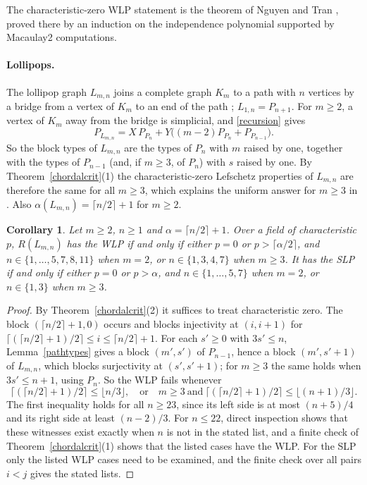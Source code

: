 \documentclass[11pt,a4paper]{article}
\newtheorem{corollary}[theorem]{Corollary}
\theoremstyle{definition}
\begin{document}
The characteristic-zero WLP statement is the theorem of Nguyen and Tran \cite[Theorem~1.2(1)]{NT}, proved there by an induction on the independence polynomial supported by Macaulay2 computations.

\paragraph{Lollipops.}
The lollipop graph $L_{m,n}$ joins a complete graph $K_m$ to a path with $n$ vertices by a bridge from a vertex of $K_m$ to an end of the path \cite{TPS}; $L_{1,n}=P_{n+1}$. For $m\ge2$, a vertex of $K_m$ away from the bridge is simplicial, and \eqref{recursion} gives
\[
 P_{L_{m,n}}=X\,P_{P_n}+Y\big((m-2)P_{P_n}+P_{P_{n-1}}\big).
\]
So the block types of $L_{m,n}$ are the types of $P_n$ with $m$ raised by one, together with the types of $P_{n-1}$ (and, if $m\ge3$, of $P_n$) with $s$ raised by one. By Theorem~\ref{chordalcrit}(1) the characteristic-zero Lefschetz properties of $L_{m,n}$ are therefore the same for all $m\ge3$, which explains the uniform answer for $m\ge3$ in \cite{TPS}. Also $\alpha(L_{m,n})=\lceil n/2\rceil+1$ for $m\ge2$.

\begin{corollary}\label{lollipops}
Let $m\ge2$, $n\ge1$ and $\alpha=\lceil n/2\rceil+1$. Over a field of characteristic $p$, $R(L_{m,n})$ has the WLP if and only if either $p=0$ or $p>\lceil\alpha/2\rceil$, and $n\in\{1,\dots,5,7,8,11\}$ when $m=2$, or $n\in\{1,3,4,7\}$ when $m\ge3$. It has the SLP if and only if either $p=0$ or $p>\alpha$, and $n\in\{1,\dots,5,7\}$ when $m=2$, or $n\in\{1,3\}$ when $m\ge3$.
\end{corollary}
\begin{proof}
By Theorem~\ref{chordalcrit}(2) it suffices to treat characteristic zero. The block $(\lceil n/2\rceil+1,0)$ occurs and blocks injectivity at $(i,i+1)$ for $\lceil(\lceil n/2\rceil+1)/2\rceil\le i\le\lceil n/2\rceil+1$. For each $s'\ge0$ with $3s'\le n$, Lemma~\ref{pathtypes} gives a block $(m',s')$ of $P_{n-1}$, hence a block $(m',s'+1)$ of $L_{m,n}$, which blocks surjectivity at $(s',s'+1)$; for $m\ge3$ the same holds when $3s'\le n+1$, using $P_n$. So the WLP fails whenever
\[
 \big\lceil(\lceil n/2\rceil+1)/2\big\rceil\le\lfloor n/3\rfloor,\quad\text{or}\quad m\ge3\ \text{and}\ \big\lceil(\lceil n/2\rceil+1)/2\big\rceil\le\lfloor(n+1)/3\rfloor .
\]
The first inequality holds for all $n\ge23$, since its left side is at most $(n+5)/4$ and its right side at least $(n-2)/3$. For $n\le22$, direct inspection shows that these witnesses exist exactly when $n$ is not in the stated list, and a finite check of Theorem~\ref{chordalcrit}(1) shows that the listed cases have the WLP. For the SLP only the listed WLP cases need to be examined, and the finite check over all pairs $i<j$ gives the stated lists.
\end{proof}
\end{document}
